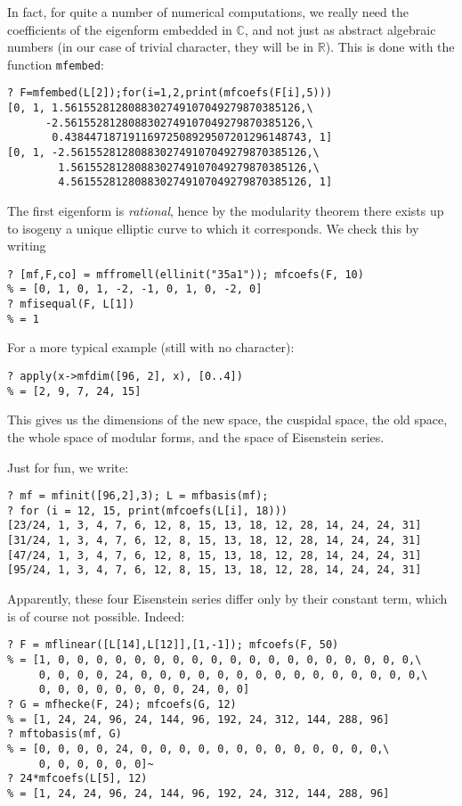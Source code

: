 \documentclass[11pt]{article}
\newcommand{\R}{{\mathbb R}}
\newcommand{\C}{{\mathbb C}}
\def\kbd#1{{\tt #1}}
\begin{document}
In fact, for quite a number of numerical computations, we really need the
coefficients of the eigenform embedded in $\C$, and not just as abstract
algebraic numbers (in our case of trivial character, they will be in $\R$).
This is done with the function \kbd{mfembed}:

\begin{verbatim}
? F=mfembed(L[2]);for(i=1,2,print(mfcoefs(F[i],5)))
[0, 1, 1.5615528128088302749107049279870385126,\
      -2.5615528128088302749107049279870385126,\
       0.43844718719116972508929507201296148743, 1]
[0, 1, -2.5615528128088302749107049279870385126,\
        1.5615528128088302749107049279870385126,\
        4.5615528128088302749107049279870385126, 1]
\end{verbatim}

The first eigenform is \emph{rational}, hence by the modularity theorem there
exists up to isogeny a unique elliptic curve to which it corresponds.
We check this by writing

\begin{verbatim}
? [mf,F,co] = mffromell(ellinit("35a1")); mfcoefs(F, 10)
% = [0, 1, 0, 1, -2, -1, 0, 1, 0, -2, 0]
? mfisequal(F, L[1])
% = 1
\end{verbatim}

For a more typical example (still with no character):

\begin{verbatim}
? apply(x->mfdim([96, 2], x), [0..4])
% = [2, 9, 7, 24, 15]
\end{verbatim}

This gives us the dimensions of the new space, the cuspidal space,
the old space, the whole space of modular forms, and the space of Eisenstein
series.

Just for fun, we write:

\begin{verbatim}
? mf = mfinit([96,2],3); L = mfbasis(mf);
? for (i = 12, 15, print(mfcoefs(L[i], 18)))
[23/24, 1, 3, 4, 7, 6, 12, 8, 15, 13, 18, 12, 28, 14, 24, 24, 31]
[31/24, 1, 3, 4, 7, 6, 12, 8, 15, 13, 18, 12, 28, 14, 24, 24, 31]
[47/24, 1, 3, 4, 7, 6, 12, 8, 15, 13, 18, 12, 28, 14, 24, 24, 31]
[95/24, 1, 3, 4, 7, 6, 12, 8, 15, 13, 18, 12, 28, 14, 24, 24, 31]
\end{verbatim}

Apparently, these four Eisenstein series differ only by their constant
term, which is of course not possible. Indeed:

\begin{verbatim}
? F = mflinear([L[14],L[12]],[1,-1]); mfcoefs(F, 50)
% = [1, 0, 0, 0, 0, 0, 0, 0, 0, 0, 0, 0, 0, 0, 0, 0, 0, 0, 0, 0,\
     0, 0, 0, 0, 24, 0, 0, 0, 0, 0, 0, 0, 0, 0, 0, 0, 0, 0, 0, 0,\
     0, 0, 0, 0, 0, 0, 0, 0, 24, 0, 0]
? G = mfhecke(F, 24); mfcoefs(G, 12)
% = [1, 24, 24, 96, 24, 144, 96, 192, 24, 312, 144, 288, 96]
? mftobasis(mf, G)
% = [0, 0, 0, 0, 24, 0, 0, 0, 0, 0, 0, 0, 0, 0, 0, 0, 0, 0,\
     0, 0, 0, 0, 0, 0]~
? 24*mfcoefs(L[5], 12)
% = [1, 24, 24, 96, 24, 144, 96, 192, 24, 312, 144, 288, 96]
\end{verbatim}
\end{document}
